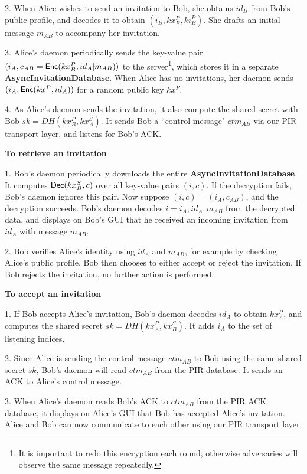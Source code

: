2. When Alice wishes to send an invitation to Bob, she obtains $id_B$ from Bob's public profile, and decodes it to obtain $(i_B, kx_B^P, ki_B^P)$. She drafts an initial message $m_{AB}$ to accompany her invitation. 

3. Alice's daemon periodically sends the key-value pair $(i_A, c_{AB} = \mathsf{Enc}(kx_B^P, id_A \vert m_{AB}))$ to the server\footnote{It is important to redo this encryption each round, otherwise adversaries will observe the same message repeatedly.}, which stores it in a separate \textbf{AsyncInvitationDatabase}. When Alice has no invitations, her daemon sends $(i_A, \mathsf{Enc}(kx^P, id_A))$ for a random public key $kx^P$.

4. As Alice's daemon sends the invitation, it also compute the shared secret with Bob $sk = DH(kx_B^P, kx^S_A)$. It sends Bob a ``control message" $ctm_{AB}$ via our PIR transport layer, and listens for Bob's ACK.

\textbf{To retrieve an invitation}

1. Bob's daemon periodically downloads the entire \textbf{AsyncInvitationDatabase}. It computes $\mathsf{Dec}(kx^S_B, c)$ over all key-value pairs $(i, c)$. If the decryption fails, Bob's daemon ignores this pair. Now suppose $(i, c) = (i_A, c_{AB})$, and the decryption succeeds. Bob's daemon decodes $i = i_A, id_A, m_{AB}$ from the decrypted data, and displays on Bob's GUI that he received an incoming invitation from $id_A$ with message $m_{AB}$.

2. Bob verifies Alice's identity using $id_A$ and $m_{AB}$, for example by checking Alice's public profile. Bob then chooses to either accept or reject the invitation. If Bob rejects the invitation, no further action is performed. 

\textbf{To accept an invitation}

1. If Bob accepts Alice's invitation, Bob's daemon decodes $id_A$ to obtain $kx_A^P$, and computes the shared secret $sk = DH(kx_A^P, kx_B^S)$. It adds $i_A$ to the set of listening indices.

2. Since Alice is sending the control message $ctm_{AB}$ to Bob using the same shared secret $sk$, Bob's daemon will read $ctm_{AB}$ from the PIR database. It sends an ACK to Alice's control message.

3. When Alice's daemon reads Bob's ACK to $ctm_{AB}$ from the PIR ACK database, it displays on Alice's GUI that Bob has accepted Alice's invitation. Alice and Bob can now communicate to each other using our PIR transport layer.

